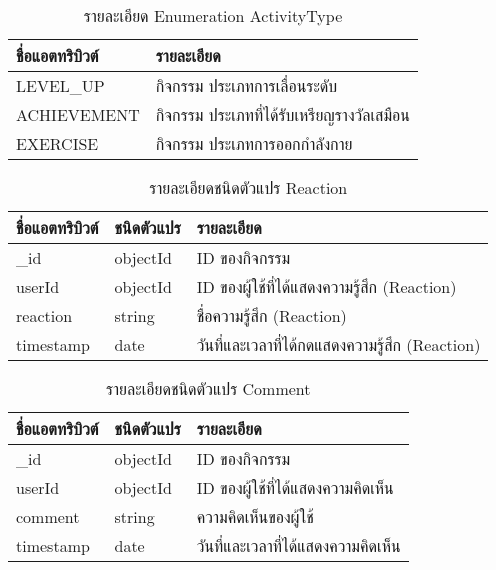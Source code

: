 \begin{table}
    \caption{รายละเอียด Enumeration ActivityType}
    \begin{tabularx}{\textwidth}{ | l | X | }
        \hline
        \bf ชื่อแอตทริบิวต์ & \bf รายละเอียด \\\hline
        LEVEL\_UP & กิจกรรม ประเภทการเลื่อนระดับ\\\hline
        ACHIEVEMENT & กิจกรรม ประเภทที่ได้รับเหรียญรางวัลเสมือน\\\hline
        EXERCISE & กิจกรรม ประเภทการออกกำลังกาย\\\hline
    \end{tabularx}
\end{table}

\begin{table}
    \caption{รายละเอียดชนิดตัวแปร Reaction}
    \begin{tabularx}{\textwidth}{ | l | l | X | }
        \hline
        \bf ชื่อแอตทริบิวต์ & \bf ชนิดตัวแปร & \bf รายละเอียด \\\hline
        \_id & objectId & ID ของกิจกรรม\\\hline
        userId & objectId & ID ของผู้ใช้ที่ได้แสดงความรู้สึก (Reaction)\\\hline
        reaction & string & ชื่อความรู้สึก (Reaction)\\\hline
        timestamp & date & วันที่และเวลาที่ได้กดแสดงความรู้สึก (Reaction)\\\hline
    \end{tabularx}
\end{table}

\begin{table}
    \caption{รายละเอียดชนิดตัวแปร Comment}
    \begin{tabularx}{\textwidth}{ | l | l | X | }
        \hline
        \bf ชื่อแอตทริบิวต์ & \bf ชนิดตัวแปร & \bf รายละเอียด \\\hline
        \_id & objectId & ID ของกิจกรรม\\\hline
        userId & objectId & ID ของผู้ใช้ที่ได้แสดงความคิดเห็น\\\hline
        comment & string & ความคิดเห็นของผู้ใช้\\\hline
        timestamp & date & วันที่และเวลาที่ได้แสดงความคิดเห็น\\\hline
    \end{tabularx}
\end{table}

